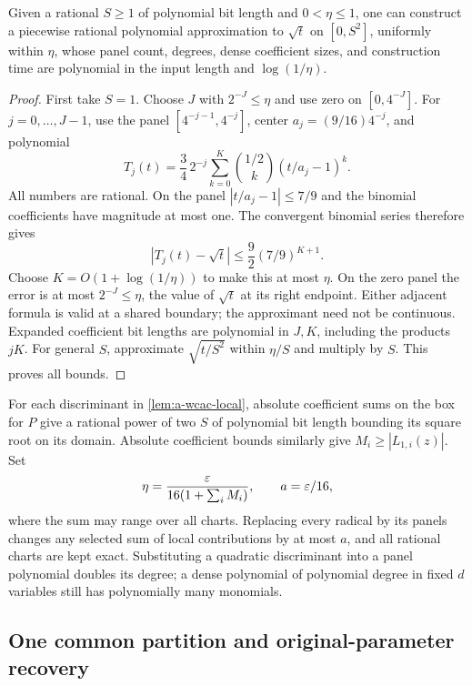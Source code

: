 \begin{lemma}
\label{lem:a-wcac-panels}
Given a rational $S\ge1$ of polynomial bit length and $0<\eta\le1$, one
can construct a piecewise rational polynomial approximation to $\sqrt t$
on $[0,S^2]$, uniformly within $\eta$, whose panel count, degrees, dense
coefficient sizes, and construction time are polynomial in the input
length and $\log(1/\eta)$.
\end{lemma}
\begin{proof}
First take $S=1$. Choose $J$ with $2^{-J}\le\eta$ and use zero on
$[0,4^{-J}]$. For $j=0,\ldots,J-1$, use the panel
$[4^{-j-1},4^{-j}]$, center $a_j=(9/16)4^{-j}$, and polynomial
\[
 T_j(t)=\frac34\,2^{-j}
       \sum_{k=0}^K \binom{1/2}{k}(t/a_j-1)^k.
\]
All numbers are rational. On the panel $|t/a_j-1|\le7/9$ and the binomial
coefficients have magnitude at most one. The convergent binomial series
therefore gives
\[
 |T_j(t)-\sqrt t|\le\frac92(7/9)^{K+1}.
\]
Choose $K=O(1+\log(1/\eta))$ to make this at most $\eta$. On the zero
panel the error is at most $2^{-J}\le\eta$, the value of $\sqrt t$ at its
right endpoint. Either adjacent formula is valid at a shared boundary;
the approximant need not be continuous. Expanded coefficient bit lengths
are polynomial in $J,K$, including the products $jK$. For general $S$,
approximate $\sqrt{t/S^2}$ within $\eta/S$ and multiply by $S$. This
proves all bounds.
\end{proof}

For each discriminant in \cref{lem:a-wcac-local}, absolute coefficient
sums on the box for $P$ give a rational power of two $S$ of polynomial
bit length bounding its square root on its domain. Absolute coefficient
bounds similarly give $M_i\ge |L_{1,i}(z)|$. Set
\begin{equation}
 \eta=\frac{\varepsilon}{16(1+\sum_i M_i)},\qquad a=\varepsilon/16,
 \label{eq:a-wcac-error}
\end{equation}
where the sum may range over all charts. Replacing every radical by its
panels changes any selected sum of local contributions by at most $a$,
and all rational charts are kept exact. Substituting a quadratic
discriminant into a panel polynomial doubles its degree; a dense
polynomial of polynomial degree in fixed $d$ variables still has
polynomially many monomials.

\subsection{One common partition and original-parameter recovery}

